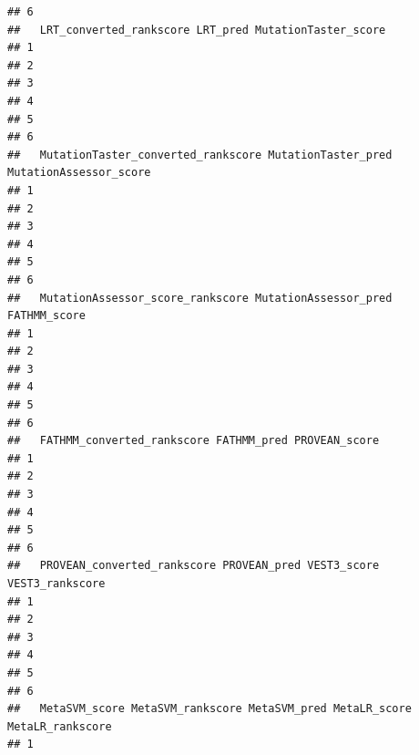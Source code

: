 \documentclass[
]{article}
\begin{document}
\begin{verbatim}
## 6                                                                            
##   LRT_converted_rankscore LRT_pred MutationTaster_score
## 1                                                      
## 2                                                      
## 3                                                      
## 4                                                      
## 5                                                      
## 6                                                      
##   MutationTaster_converted_rankscore MutationTaster_pred MutationAssessor_score
## 1                                                                              
## 2                                                                              
## 3                                                                              
## 4                                                                              
## 5                                                                              
## 6                                                                              
##   MutationAssessor_score_rankscore MutationAssessor_pred FATHMM_score
## 1                                                                    
## 2                                                                    
## 3                                                                    
## 4                                                                    
## 5                                                                    
## 6                                                                    
##   FATHMM_converted_rankscore FATHMM_pred PROVEAN_score
## 1                                                     
## 2                                                     
## 3                                                     
## 4                                                     
## 5                                                     
## 6                                                     
##   PROVEAN_converted_rankscore PROVEAN_pred VEST3_score VEST3_rankscore
## 1                                                                     
## 2                                                                     
## 3                                                                     
## 4                                                                     
## 5                                                                     
## 6                                                                     
##   MetaSVM_score MetaSVM_rankscore MetaSVM_pred MetaLR_score MetaLR_rankscore
## 1                                                                           

\end{verbatim}
\end{document}
